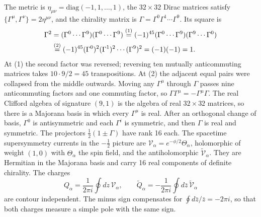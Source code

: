 \begin{tcolorbox}[breakable]
\begin{remark}
The metric is $\eta_{\mu\nu} = \mathrm{diag}(-1,1,\dots,1)$, the $32\times32$ Dirac matrices satisfy $\{\Gamma^\mu,\Gamma^\nu\} = 2\eta^{\mu\nu}$, and the chirality matrix is $\Gamma = \Gamma^0\Gamma^1\cdots\Gamma^9$. Its square is
\begin{align*}
\Gamma^2 &= (\Gamma^0\cdots\Gamma^9)(\Gamma^0\cdots\Gamma^9)
\overset{(1)}{=} (-1)^{45}(\Gamma^0\cdots\Gamma^9)(\Gamma^9\cdots\Gamma^0)\\
&\overset{(2)}{=} (-1)^{45}(\Gamma^0)^2(\Gamma^1)^2\cdots(\Gamma^9)^2 = (-1)(-1) = 1 .
\end{align*}
At (1) the second factor was reversed; reversing ten mutually anticommuting matrices takes $10\cdot9/2 = 45$ transpositions. At (2) the adjacent equal pairs were collapsed from the middle outwards. Moving any $\Gamma^\mu$ through $\Gamma$ passes nine anticommuting factors and one commuting factor, so $\Gamma\Gamma^\mu = -\Gamma^\mu\Gamma$. The real Clifford algebra of signature $(9,1)$ is the algebra of real $32\times32$ matrices, so there is a Majorana basis in which every $\Gamma^\mu$ is real. After an orthogonal change of basis, $\Gamma^0$ is antisymmetric and each $\Gamma^i$ is symmetric, and then $\Gamma$ is real and symmetric. The projectors $\frac12(1\pm\Gamma)$ have rank 16 each. The spacetime supersymmetry currents in the $-\frac12$ picture are $\mathcal V_\alpha = e^{-\phi/2}\Theta_\alpha$, holomorphic of weight $(1,0)$ with $\Theta_\alpha$ the spin field, and the antiholomorphic $\tilde{\mathcal V}_\alpha$. They are Hermitian in the Majorana basis and carry 16 real components of definite chirality. The charges
\begin{equation}
Q_\alpha = \frac{1}{2\pi i}\oint dz\,\mathcal V_\alpha , \qquad \tilde Q_\alpha = -\frac{1}{2\pi i}\oint d\bar z\,\tilde{\mathcal V}_\alpha
\tag{D.2}\label{charges}
\end{equation}
are contour independent. The minus sign compensates for $\oint d\bar z/\bar z = -2\pi i$, so that both charges measure a simple pole with the same sign.


\end{remark}
\end{tcolorbox}
